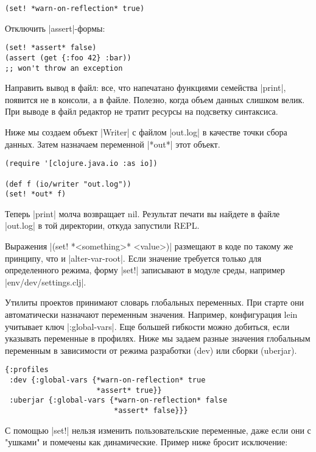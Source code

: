 \begin{verbatim}
(set! *warn-on-reflection* true)
\end{verbatim}

Отключить \spverb|assert|-формы:

\begin{verbatim}
(set! *assert* false)
(assert (get {:foo 42} :bar))
;; won't throw an exception
\end{verbatim}

Направить вывод в файл: все, что напечатано функциями семейства \spverb|print|,
появится не в консоли, а в файле. Полезно, когда объем данных слишком велик. При
выводе в файл редактор не тратит ресурсы на подсветку синтаксиса.

Ниже мы создаем объект \spverb|Writer| с файлом \spverb|out.log| в качестве точки сбора
данных. Затем назначаем переменной \spverb|*out*| этот объект.

\begin{verbatim}
(require '[clojure.java.io :as io])

(def f (io/writer "out.log"))
(set! *out* f)
\end{verbatim}

Теперь \spverb|print| молча возвращает nil. Результат печати вы найдете в файле
\spverb|out.log| в той директории, откуда запустили REPL.

Выражения \spverb|(set! *<something>* <value>)| размещают в коде по такому же принципу,
что и \spverb|alter-var-root|. Если значение требуется только для определенного режима,
форму \spverb|set!| записывают в модуле среды, например \spverb|env/dev/settings.clj|.

Утилиты проектов принимают словарь глобальных переменных. При старте они
автоматически назначают переменным значения. Например, конфигурация lein
учитывает ключ \spverb|:global-vars|. Еще большей гибкости можно добиться, если
указывать переменные в профилях. Ниже мы задаем разные значения глобальным
переменным в зависимости от режима разработки (dev) или сборки (uberjar).

\begin{verbatim}
{:profiles
 :dev {:global-vars {*warn-on-reflection* true
                     *assert* true}}
 :uberjar {:global-vars {*warn-on-reflection* false
                         *assert* false}}}
\end{verbatim}

С помощью \spverb|set!| нельзя изменить пользовательские переменные, даже если они с
"ушками" и помечены как динамические. Пример ниже бросит исключение:

